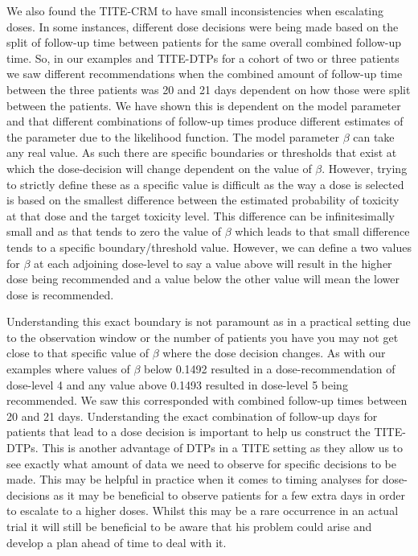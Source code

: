 We also found the TITE-CRM to have small inconsistencies when escalating doses. In some instances, different dose decisions were being made based on the split of follow-up time between patients for the same overall combined follow-up time. So, in our examples and TITE-DTPs for a cohort of two or three patients we saw different recommendations when the combined amount of follow-up time between the three patients was 20 and 21 days dependent on how those were split between the patients. We have shown this is dependent on the model parameter and that different combinations of follow-up times produce different estimates of the parameter due to the likelihood function. The model parameter $\beta$ can take any real value. As such there are specific boundaries or thresholds that exist at which the dose-decision will change dependent on the value of $\beta$. However, trying to strictly define these as a specific value is difficult as the way a dose is selected is based on the smallest difference between the estimated probability of toxicity at that dose and the target toxicity level. This difference can be infinitesimally small and as that tends to zero the value of $\beta$ which leads to that small difference tends to a specific boundary/threshold value. However, we can define a two values for $\beta$ at each adjoining dose-level to say a value above will result in the higher dose being recommended and a value below the other value will mean the lower dose is recommended.

Understanding this exact boundary is not paramount as in a practical setting due to the observation window or the number of patients you have you may not get close to that specific value of $\beta$ where the dose decision changes. As with our examples where values of $\beta$ below 0.1492 resulted in a dose-recommendation of dose-level 4 and any value above 0.1493 resulted in dose-level 5 being recommended. We saw this corresponded with combined follow-up times between 20 and 21 days. Understanding the exact combination of follow-up days for patients that lead to a dose decision is important to help us construct the TITE-DTPs. This is another advantage of DTPs in a TITE setting as they allow us to see exactly what amount of data we need to observe for specific decisions to be made. This may be helpful in practice when it comes to timing analyses for dose-decisions as it may be beneficial to observe patients for a few extra days in order to escalate to a higher doses. Whilst this may be a rare occurrence in an actual trial it will still be beneficial to be aware that his problem could arise and develop a plan ahead of time to deal with it. 

